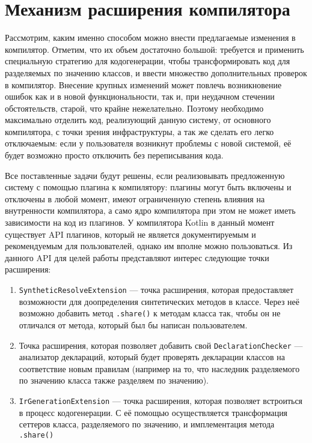 \documentclass[specification,annotation,times]{itmo-student-thesis}
\begin{document}
\section{Механизм расширения компилятора}\label{codegen}

Рассмотрим, каким именно способом можно внести предлагаемые изменения в компилятор. Отметим, что их объем достаточно большой: требуется и применить специальную стратегию для кодогенерации, чтобы трансформировать код для разделяемых по значению классов, и ввести множество дополнительных проверок в компилятор.
Внесение крупных изменений может повлечь возникновение ошибок как и в новой функциональности, так и, при неудачном стечении обстоятельств, старой, что крайне нежелательно.
Поэтому необходимо максимально отделить код, реализующий данную систему, от основного компилятора, с точки зрения инфраструктуры, а так же сделать его легко отключаемым: если у пользователя возникнут проблемы с новой системой, её будет возможно просто отключить без переписывания кода.

Все поставленные задачи будут решены, если реализовывать предложенную систему с помощью плагина к компилятору: плагины могут быть включены и отключены в любой момент, имеют ограниченную степень влияния на внутренности компилятора, а само ядро компилятора при этом не может иметь зависимости на код из плагинов.
У компилятора Kotlin в данный момент существует API плагинов, который не является документируемым и рекомендуемым для пользователей, однако им вполне можно пользоваться. Из данного API для целей работы представляют интерес следующие точки расширения:

\begin{enumerate}
	\item \texttt{SyntheticResolveExtension} --- точка расширения, которая предоставляет возможности для доопределения синтетических методов в классе. Через неё возможно добавить метод \texttt{.share()} к методам класса так, чтобы он не отличался от метода, который был бы написан пользователем.
	\item Точка расширения, которая позволяет добавить свой \texttt{DeclarationChecker} --- анализатор деклараций, который будет проверять декларации классов на соответствие новым правилам (например на то, что наследник разделяемого по значению класса также разделяем по значению).
	\item \texttt{IrGenerationExtension} --- точка расширения, которая позволяет встроиться в процесс кодогенерации. С её помощью осуществляется трансформация сеттеров класса, разделяемого по значению, и имплементация метода \texttt{.share()}
\end{enumerate}
\end{document}
